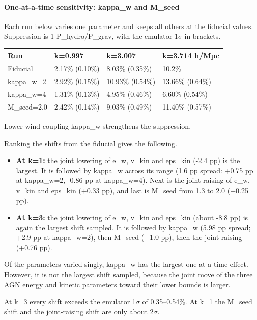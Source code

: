 \documentclass[11pt,a4paper]{article}
\begin{document}
\paragraph{One-at-a-time sensitivity: kappa\_w and M\_seed}
Each run below varies one parameter and keeps all others at the fiducial values. Suppression is 1-P\_hydro/P\_grav, with the emulator 1$\sigma$ in brackets.

\begin{longtable}{@{}p{}p{}p{}p{}@{}}
\toprule
\textbf{Run} & \textbf{k=0.997} & \textbf{k=3.007} & \textbf{k=3.714 h/Mpc} \\ \midrule \endhead
Fiducial & 2.17\% (0.10\%) & 8.03\% (0.35\%) & 10.2\% \\
kappa\_w=2 & 2.92\% (0.15\%) & 10.93\% (0.54\%) & 13.66\% (0.64\%) \\
kappa\_w=4 & 1.31\% (0.13\%) & 4.95\% (0.46\%) & 6.60\% (0.54\%) \\
M\_seed=2.0 & 2.42\% (0.14\%) & 9.03\% (0.49\%) & 11.40\% (0.57\%) \\
\bottomrule\end{longtable}
Lower wind coupling kappa\_w strengthens the suppression.

Ranking the shifts from the fiducial gives the following.

\begin{itemize}
  \item \textbf{At k=1:} the joint lowering of e\_w, v\_kin and eps\_kin (-2.4 pp) is the largest. It is followed by kappa\_w across its range (1.6 pp spread: +0.75 pp at kappa\_w=2, -0.86 pp at kappa\_w=4). Next is the joint raising of e\_w, v\_kin and eps\_kin (+0.33 pp), and last is M\_seed from 1.3 to 2.0 (+0.25 pp).
  \item \textbf{At k=3:} the joint lowering of e\_w, v\_kin and eps\_kin (about -8.8 pp) is again the largest shift sampled. It is followed by kappa\_w (5.98 pp spread; +2.9 pp at kappa\_w=2), then M\_seed (+1.0 pp), then the joint raising (+0.76 pp).
\end{itemize}
Of the parameters varied singly, kappa\_w has the largest one-at-a-time effect. However, it is not the largest shift sampled, because the joint move of the three AGN energy and kinetic parameters toward their lower bounds is larger.

At k=3 every shift exceeds the emulator 1$\sigma$ of 0.35--0.54\%. At k=1 the M\_seed shift and the joint-raising shift are only about 2$\sigma$.
\end{document}
